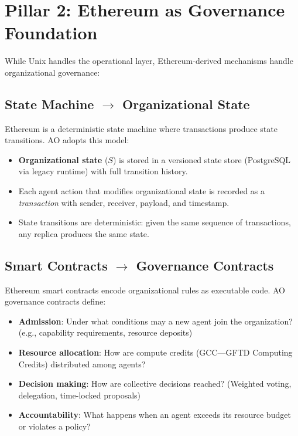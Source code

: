 \documentclass[11pt,a4paper]{article}
\begin{document}
\section{Pillar 2: Ethereum as Governance Foundation}

While Unix handles the operational layer, Ethereum-derived mechanisms handle
organizational governance:

\subsection{State Machine $\rightarrow$ Organizational State}

Ethereum is a deterministic state machine where transactions produce
state transitions. AO adopts this model:

\begin{itemize}[nosep]
  \item \textbf{Organizational state} ($S$) is stored in a versioned state
    store (PostgreSQL via legacy runtime) with full transition history.
  \item Each agent action that modifies organizational state is recorded as a
    \emph{transaction} with sender, receiver, payload, and timestamp.
  \item State transitions are deterministic: given the same sequence of
    transactions, any replica produces the same state.
\end{itemize}

\subsection{Smart Contracts $\rightarrow$ Governance Contracts}

Ethereum smart contracts encode organizational rules as executable code. AO
governance contracts define:

\begin{itemize}[nosep]
  \item \textbf{Admission}: Under what conditions may a new agent join the
    organization? (e.g., capability requirements, resource deposits)
  \item \textbf{Resource allocation}: How are compute credits (GCC---GFTD
    Computing Credits) distributed among agents?
  \item \textbf{Decision making}: How are collective decisions reached?
    (Weighted voting, delegation, time-locked proposals)
  \item \textbf{Accountability}: What happens when an agent exceeds its
    resource budget or violates a policy?
\end{itemize}
\end{document}
